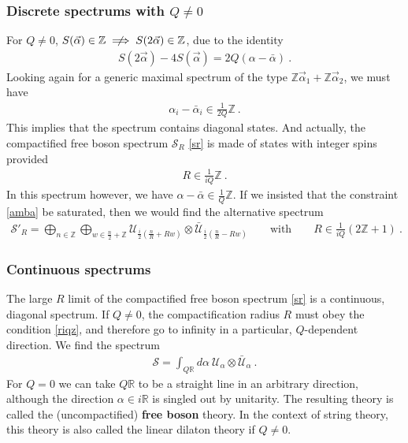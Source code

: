 \documentclass[12pt, a4paper, notitlepage, twoside]{report}
\numberwithin{equation}{section}
\theoremstyle{break}
\begin{document}
\subsubsection{Discrete spectrums with $Q\neq 0$}

For $Q\neq 0$, $S(\vec\alpha)\in\mathbb{Z}\centernot\implies S(2\vec\alpha)\in\mathbb{Z}$, due to the identity
\begin{align}
 S(2\vec\alpha) - 4 S(\vec\alpha) = 2Q(\alpha-\bar \alpha)\ .
\end{align}
Looking again for a generic maximal spectrum of the type $\mathbb{Z}\vec\alpha_1 + \mathbb{Z}\vec\alpha_2$, we must have 
\begin{align}
 \alpha_i-\bar\alpha_i\in \frac{1}{2Q}\mathbb{Z}\ .
 \label{amba}
\end{align}
This implies that the spectrum contains diagonal states. And actually, the compactified free boson spectrum $\mathcal{S}_R$ \eqref{sr} is made of states with integer spins provided
\begin{align}
 R \in \frac{1}{iQ}\mathbb{Z}\ .
 \label{riqz}
\end{align}
In this spectrum however, we have $\alpha-\bar\alpha\in\frac{1}{Q}\mathbb{Z}$. 
If we insisted that the constraint \eqref{amba} be saturated, then we would find the alternative spectrum
\begin{align}
 \mathcal{S}'_R = \bigoplus_{n\in \mathbb{Z}} \bigoplus_{w\in \frac{n}{2}+\mathbb{Z}} \mathcal{U}_{\frac{i}{2}\left(\frac{n}{R} + Rw\right)} \otimes \bar{\mathcal{U}}_{\frac{i}{2}\left(\frac{n}{R} - Rw\right)} \qquad \text{with}\qquad R \in \frac{1}{iQ}(2\mathbb{Z}+1)\ .
\end{align}


\subsubsection{Continuous spectrums}

The large $R$ limit of the compactified free boson spectrum \eqref{sr} is a continuous, diagonal spectrum.
If $Q\neq 0$, the compactification radius $R$ must obey the condition \eqref{riqz}, and therefore go to infinity in a particular, $Q$-dependent direction. We find the spectrum 
\begin{align}
 \boxed{ \mathcal{S} = \int_{Q\mathbb{R}} d\alpha\ \mathcal{U}_\alpha\otimes \bar{\mathcal{U}}_\alpha}\ .
 \label{sc}
\end{align}
For $Q=0$ we can take $Q\mathbb{R}$ to be a straight line in an arbitrary direction, although the direction $\alpha\in i\mathbb{R}$ is singled out by unitarity.   
The resulting theory is called the (uncompactified) \textbf{\boldmath free boson} theory.
In the context of string theory, this theory is also called the linear dilaton theory if $Q\neq 0$. 
\end{document}
